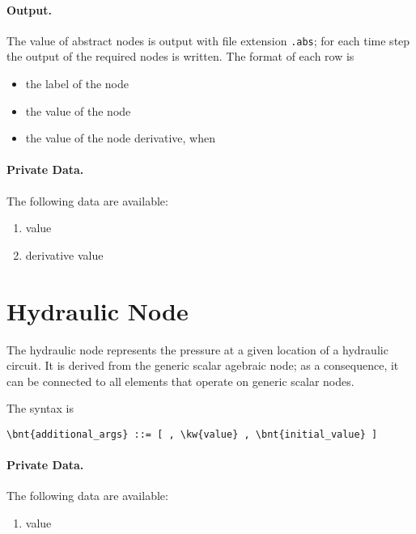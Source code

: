 \paragraph{Output.}
The value of abstract nodes is output with file extension \texttt{.abs}; for
each time step the output of the required nodes is written.
The format of each row is
\begin{itemize}
    \item the label of the node
    \item the value of the node
    \item the value of the node derivative, when 
\end{itemize}

\paragraph{Private Data.}
\label{sec:NODE:ABSTRACT:PRIV}
The following data are available:
\begin{enumerate}
\item {} value
\item {} derivative value
\end{enumerate}



\section{Hydraulic Node}
\label{sec:NODE:HYDRAULIC}
The hydraulic node represents the pressure
at a given location of a hydraulic circuit.
It is derived from the generic scalar agebraic node; as a consequence,
it can be connected to all elements that operate on generic scalar nodes. 

The syntax is
\begin{Verbatim}[commandchars=\\\{\}]
    \bnt{additional_args} ::= [ , \kw{value} , \bnt{initial_value} ]
\end{Verbatim}

\paragraph{Private Data.}
\label{sec:NODE:HYDRAULIC:PRIV}
The following data are available:
\begin{enumerate}
\item {} value
\end{enumerate}



